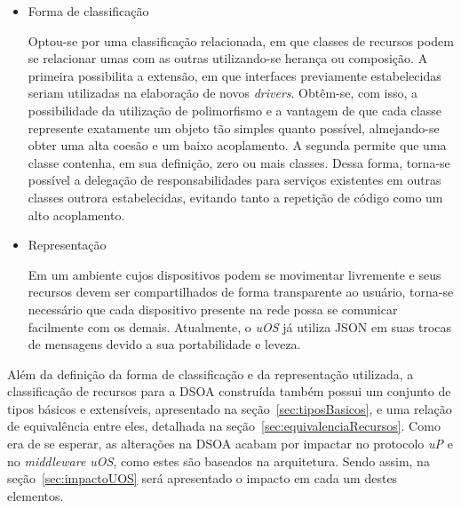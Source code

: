 \begin{itemize}
	\item Forma de classificação

	Optou-se por uma classificação relacionada, em que classes de recursos podem se relacionar umas com as outras utilizando-se herança ou composição. A primeira possibilita a extensão, em que interfaces previamente estabelecidas seriam utilizadas na elaboração de novos \emph{drivers}. Obtêm-se, com isso, a possibilidade da utilização de polimorfismo e a vantagem de que cada classe represente exatamente um objeto tão simples quanto possível, almejando-se obter uma alta coesão e um baixo acoplamento. A segunda permite que uma classe contenha, em sua definição, zero ou mais classes. Dessa forma, torna-se possível a delegação de responsabilidades para serviços existentes em outras classes outrora estabelecidas, evitando tanto a repetição de código como um alto acoplamento.

	\item Representação

	Em um ambiente cujos dispositivos podem se movimentar livremente e seus recursos devem ser compartilhados de forma transparente ao usuário, torna-se necessário que cada dispositivo presente na rede possa se comunicar facilmente com os demais. Atualmente, o \emph{uOS} já utiliza JSON em suas trocas de mensagens devido a sua portabilidade e leveza.

	\begin{comment}
	Tal formato apresenta as seguintes características:
	
		\begin{itemize}
	 		\item Baixo custo computacional~\cite{comparativojson};
	 		\item É auto-descritivo, o que facilita os processos de leitura e escrita por seres-humanos~\cite{json};
	 		\item É estruturado, o que facilita sua criação e análise por computadores~\cite{json};
	 		\item É independente de plataforma, pois utiliza UTF-8 como codificação~\cite{utf8}.
	 	\end{itemize}
	 \end{comment}
\end{itemize}

Além da definição da forma de classificação e da representação utilizada, a classificação de recursos para a DSOA construída também possui um conjunto de tipos básicos e extensíveis, apresentado na seção~\ref{sec:tiposBasicos}, e uma relação de equivalência entre eles, detalhada na seção~\ref{sec:equivalenciaRecursos}. Como era de se esperar, as alterações na DSOA acabam por impactar no protocolo \emph{uP} e no \emph{middleware uOS}, como estes são baseados na arquitetura. Sendo assim, na seção~\ref{sec:impactoUOS} será apresentado o impacto em cada um destes elementos.

